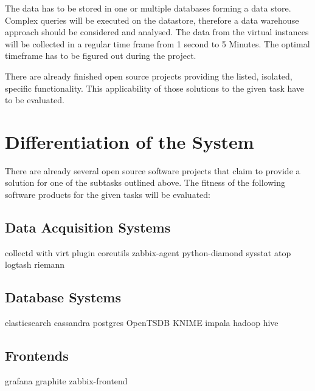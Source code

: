 The data has to be stored in one or multiple databases forming a data store.
Complex queries will be executed on the datastore, therefore a data warehouse
approach should be considered and analysed. The data from the virtual instances
will be collected in a regular time frame from 1 second to 5 Minutes. The
optimal timeframe has to be figured out during the project.

There are already finished open source projects providing the listed, isolated,
specific functionality. This applicability of those solutions to the given task
have to be evaluated.

\section{Differentiation of the System}

There are already several open source software projects that claim to provide a
solution for one of the subtasks outlined above. The fitness of the following
software products for the given tasks will be evaluated:

\subsection{Data Acquisition Systems}

\begin{outline}
    \1 collectd with virt plugin
    \1 coreutils
    \1 zabbix-agent
    \1 python-diamond
    \1 sysstat
    \1 atop
    \1 logtash
    \1 riemann
\end{outline}

\subsection{Database Systems}

\begin{outline}
    \1 elasticsearch
    \1 cassandra
    \1 postgres
    \1 OpenTSDB
    \1 KNIME
    \1 impala
    \1 hadoop
    \1 hive
\end{outline}

\subsection{Frontends}

\begin{outline}
    \1 grafana
    \1 graphite
    \1 zabbix-frontend
\end{outline}

